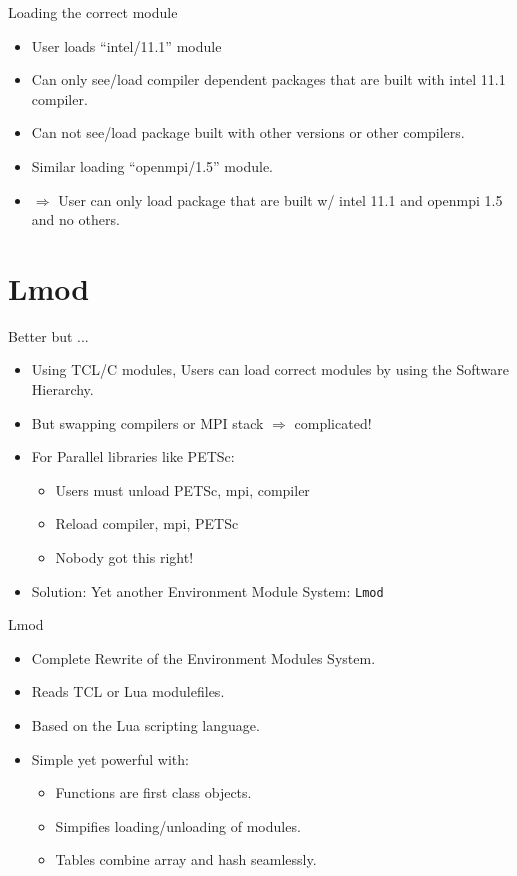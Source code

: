 \documentclass{beamer}
\begin{document}
\begin{frame}{Loading the correct module}
  \begin{itemize}
    \item User loads ``intel/11.1'' module
    \item Can only see/load compiler dependent packages that are built with
      intel 11.1 compiler.
    \item Can not see/load package built with other versions or other compilers.
    \item Similar loading ``openmpi/1.5'' module.
    \item $\Rightarrow$ User can only load package that are built w/ intel 11.1 and openmpi 1.5 and no others.
  \end{itemize}
\end{frame}

\section{Lmod}

\begin{frame}{Better but ...}
  \begin{itemize}
    \item Using TCL/C modules, Users can load correct modules by using
      the Software Hierarchy.
    \item But swapping compilers or MPI stack $\Rightarrow$ complicated!
    \item For Parallel libraries like PETSc:
      \begin{itemize}
        \item Users must unload PETSc, mpi, compiler
        \item Reload compiler, mpi, PETSc
        \item Nobody got this right!
      \end{itemize}
    \item Solution: Yet another Environment Module System: \texttt{Lmod}
  \end{itemize}
\end{frame}

\begin{frame}{Lmod}
  \begin{itemize}
    \item Complete Rewrite of the Environment Modules System.
    \item Reads TCL or Lua modulefiles.
    \item Based on the Lua scripting language.
    \item Simple yet powerful with:
      \begin{itemize}
        \item Functions are first class objects.
        \item Simpifies loading/unloading of modules.
        \item Tables combine array and hash seamlessly.
      \end{itemize}
  \end{itemize}
\end{frame}
\end{document}
